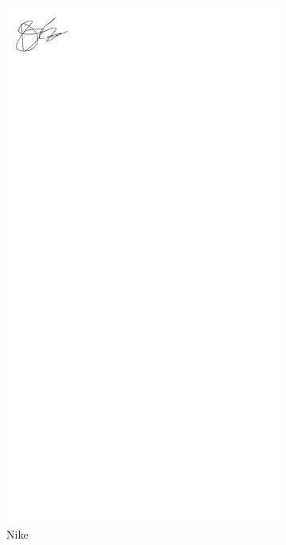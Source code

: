\documentclass{article}
\begin{document}
\begin{figure}[H]
    \centering
    \begin{subfigure}{0.32\textwidth}
        \includegraphics[width=\textwidth]{nike.png}
        \caption{Nike}
    \end{subfigure}
    \begin{subfigure}{0.32\textwidth}

\end{subfigure}
\end{figure}
\end{document}
